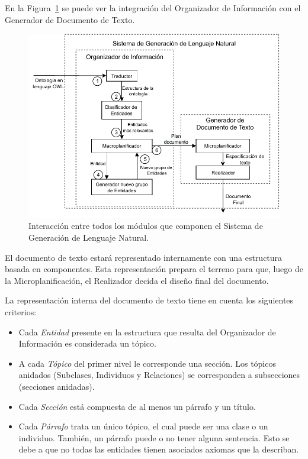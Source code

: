 En la Figura~\ref{fig:modulos_plan_documento} se puede ver la integración del Organizador de Información con el Generador de Documento de Texto.

\begin{figure}
    \centering
    \includegraphics{img/generacion_documento/modulos_SGLN_integrado.pdf}
    \caption{Interacción entre todos los módulos que componen el Sistema de Generación de Lenguaje Natural.}
    \label{fig:modulos_plan_documento}
\end{figure}

El documento de texto estará representado internamente con una estructura basada en componentes. Esta representación prepara el terreno para que, luego de la Microplanificación, el Realizador decida el diseño final del documento.

La representación interna del documento de texto tiene en cuenta los siguientes criterios:
\begin{itemize}
    \item Cada\textit{ Entidad} presente en la estructura que resulta del Organizador de Información es considerada un tópico. 
    \item A cada\textit{ Tópico} del primer nivel le corresponde una sección. Los tópicos anidados (Subclases, Individuos y Relaciones) se corresponden a subsecciones (secciones anidadas).
    \item Cada \textit{Sección} está compuesta de al menos un párrafo y un título.
    \item Cada \textit{Párrafo} trata un único tópico, el cual puede ser una clase o un individuo. También, un párrafo puede o no tener alguna sentencia. Esto se debe a que no todas las entidades tienen asociados axiomas que la describan.
\end{itemize}

